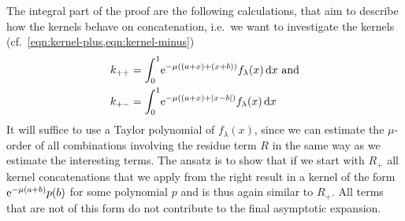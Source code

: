 The integral part of the proof are the following calculations, that aim to
describe how the kernels behave on concatenation, i.e.\ we want to investigate
the kernels (cf.\ \cref{eqn:kernel-plus,eqn:kernel-minus})
\begin{align*}
  k_{++} &= \Int{x}{\Eto{-\mu((a + x) + (x + b))}f_\lambda(x)} \text{ and}\\
  k_{+-} &= \Int{x}{\Eto{-\mu((a + x) + \Abs{x - b})}f_\lambda(x)}
\end{align*}
It will suffice to use a Taylor polynomial of $f_\lambda(x)$, since we can
estimate the $\mu$-order of all combinations involving the residue term $R$ in
the same way as we estimate the interesting terms. The ansatz is to show that if
we start with $R_+$ all kernel concatenations that we apply from the right
result in a kernel of the form $\Eto{-\mu(a+b)}p(b)$ for some polynomial $p$ and
is thus again similar to $R_+$. All terms that are not of this form do not
contribute to the final asymptotic expansion.
